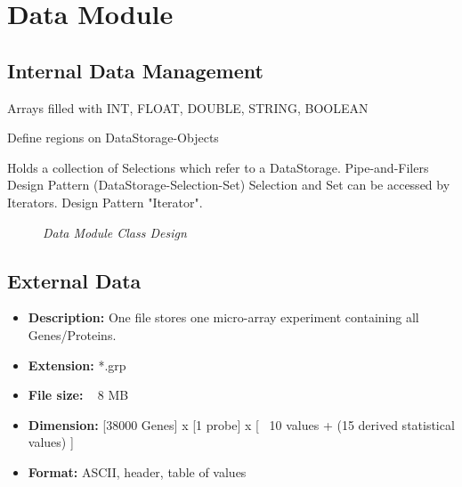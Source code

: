 \section{Data Module}

\subsection{Internal Data Management}

Arrays filled with INT, FLOAT, DOUBLE, STRING, BOOLEAN

Define regions on DataStorage-Objects

Holds a collection of Selections which refer to a DataStorage.
Pipe-and-Filers Design Pattern (DataStorage-Selection-Set)
Selection and Set can be accessed by Iterators. Design Pattern "Iterator".

\begin{figure}[ht]
\centering
{} 
\caption[Data Module Class Design]{\textit{Data Module Class Design}} 
\label{gfx:data_module_class_design}
\end{figure}

\subsection{External Data}


\begin{itemize}
\item \textbf{Description: } One file stores one micro-array experiment containing all Genes/Proteins.
\item \textbf{Extension:}  *.grp
\item \textbf{File size: } ~ 8 MB
\item \textbf{Dimension: } [38000 Genes] x [1 probe] x [ ~10 values + (15 derived statistical values) ]
\item \textbf{Format: } ASCII, header, table of values
\end{itemize}

